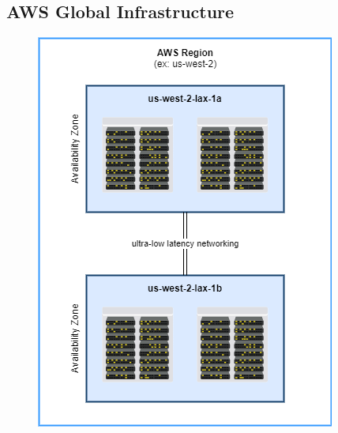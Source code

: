 \subsection{AWS Global Infrastructure}\label{subsec:aws-global-infrastructure}
\begin{figure}[h]
\includegraphics[scale=0.5]{cloud-computing/regions}
\centering\label{fig:aws-global-infrastructure}
\end{figure}


